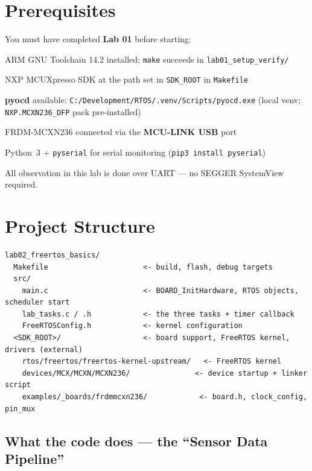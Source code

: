\documentclass[11pt, a4paper]{article}
\newcommand{\file}[1]{\texttt{\small #1}}
\begin{document}
\section{Prerequisites}

You must have completed \textbf{Lab 01} before starting:

\begin{checklist}
  \item ARM GNU Toolchain 14.2 installed; \texttt{make} succeeds in
        \file{lab01\_setup\_verify/}
  \item NXP MCUXpresso SDK at the path set in \texttt{SDK\_ROOT} in \file{Makefile}
  \item \textbf{pyocd} available: \texttt{C:/Development/RTOS/.venv/Scripts/pyocd.exe}
        (local venv; \texttt{NXP.MCXN236\_DFP} pack pre-installed)
  \item FRDM-MCXN236 connected via the \textbf{MCU-LINK USB} port
  \item Python~3 + \texttt{pyserial} for serial monitoring
        (\texttt{pip3 install pyserial})
\end{checklist}

\begin{tipbox}
  All observation in this lab is done over UART --- no SEGGER SystemView required.
\end{tipbox}

\section{Project Structure}

\begin{lstlisting}[style=textstyle]
lab02_freertos_basics/
  Makefile                      <- build, flash, debug targets
  src/
    main.c                      <- BOARD_InitHardware, RTOS objects, scheduler start
    lab_tasks.c / .h            <- the three tasks + timer callback
    FreeRTOSConfig.h            <- kernel configuration
  <SDK_ROOT>/                   <- board support, FreeRTOS kernel, drivers (external)
    rtos/freertos/freertos-kernel-upstream/   <- FreeRTOS kernel
    devices/MCX/MCXN/MCXN236/               <- device startup + linker script
    examples/_boards/frdmmcxn236/            <- board.h, clock_config, pin_mux
\end{lstlisting}

\subsection{What the code does --- the ``Sensor Data Pipeline''}
\end{document}
